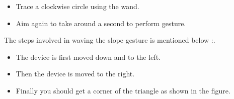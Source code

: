 \begin{enumerate}
\begin{center}
\begin{tikzpicture}
        \end{tikzpicture}
        
        
    \end{center}
    
    \begin{itemize}
        
        \item Trace a clockwise circle using the wand.
        
        \item Aim again to take around a second to perform gesture.
        
    \end{itemize}
    
    The steps involved in waving the slope gesture is mentioned below \cite{Warden:2020}:.
    
    \begin{center}
        
        
        
    \end{center}
    
    \begin{itemize}
        
        \item The device is first moved down and to the left.
        
        \item Then the device is moved to the right.
        
        \item Finally you should get a corner of the triangle as shown in the figure.
        

\end{itemize}
\end{enumerate}

